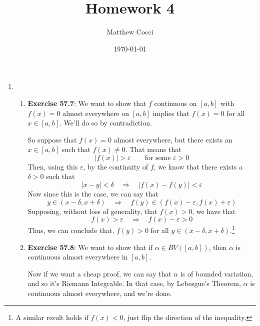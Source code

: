\documentclass[12pt]{article}
\author{Matthew Cocci}
\title{\textbf{Homework 4}}
\date{\today}
\theoremstyle{plain}
\theoremstyle{definition}
\theoremstyle{remark}
\begin{document}
\maketitle 

\begin{enumerate}

\item 
\begin{enumerate}
\item \textbf{Exercise 57.7}: We want to show that $f$ continuous on $[a,b]$ with $f(x)=0$ almost everywhere on $[a,b]$ implies that $f(x)=0$ for all $x\in[a,b]$. We'll do so by contradiction.

So suppose that $f(x)=0$ almost everywhere, but there exists an $x\in[a,b]$ such that $f(x)\neq 0$. That means that 
\[ 
    |f(x)| > \varepsilon \qquad \text{for some $\varepsilon>0$}
\]
Then, using this $\varepsilon$, by the continuity of $f$, we know that there exists a $\delta>0$ such that
\[
    |x-y|<\delta \quad \Rightarrow \quad |f(x)-f(y)|<\varepsilon
\]
Now since this is the case, we can say that
\[
    y\in(x-\delta, x+\delta) \quad \Rightarrow \quad 
    f(y) \in \left(f(x)-\varepsilon, f(x)+\varepsilon\right)
\]
Supposing, without loss of generality, that $f(x) > 0$, we have that 
\[
    f(x) > \varepsilon \quad \Rightarrow \quad
    f(x) - \varepsilon > 0
\]
Thus, we can conclude that, $f(y) > 0$ for all $y\in(x-\delta, x+\delta)$.\footnote{A similar result holds if $f(x)<0$, just flip the direction of the inequality.}

\item \textbf{Exercise 57.8}: We want to show that if $\alpha\in BV([a,b])$, then $\alpha$ is continuous almost everywhere in $[a,b]$.  

Now if we want a cheap proof, we can say that $\alpha$ is of bounded variation, and so it's Riemann Integrable. In that case, by Lebesgue's Theorem, $\alpha$ is continuous almost everywhere, and we're done.


\end{enumerate}
\end{enumerate}
\end{document}
